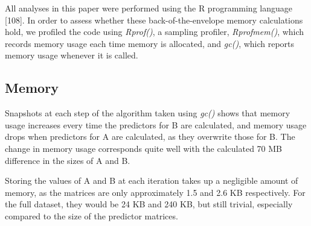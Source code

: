 \documentclass[12pt,twoside]{mitthesis-manusdown}
\begin{document}
All analyses in this paper were performed using the R programming
language {[}108{]}. In order to assess whether these
back-of-the-envelope memory calculations hold, we profiled the code
using \emph{Rprof()}, a sampling profiler, \emph{Rprofmem()}, which
records memory usage each time memory is allocated, and \emph{gc()},
which reports memory usage whenever it is called.

\subsection{Memory}\label{memory}

Snapshots at each step of the algorithm taken using \emph{gc()} shows
that memory usage increases every time the predictors for B are
calculated, and memory usage drops when predictors for A are calculated,
as they overwrite those for B. The change in memory usage corresponds
quite well with the calculated 70 MB difference in the sizes of A and B.

Storing the values of A and B at each iteration takes up a negligible
amount of memory, as the matrices are only approximately 1.5 and 2.6 KB
respectively. For the full dataset, they would be 24 KB and 240 KB, but
still trivial, especially compared to the size of the predictor
matrices.
\end{document}
